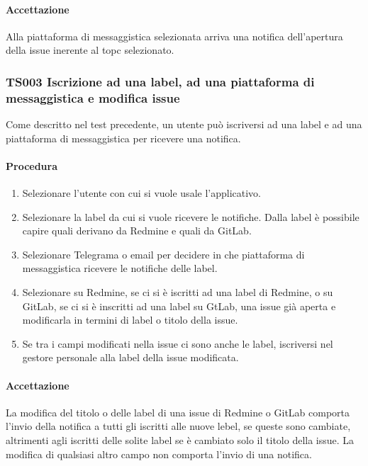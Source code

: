 		\paragraph*{Accettazione}
		Alla piattaforma di messaggistica selezionata arriva una notifica dell'apertura della issue inerente al topc selezionato.
		
	\subsubsection{TS003 Iscrizione ad una label, ad una piattaforma di messaggistica e modifica issue}
		Come descritto nel test precedente, un utente può iscriversi ad una label e ad una piattaforma di messaggistica per ricevere una notifica.
		
		\paragraph*{Procedura}
			\begin{enumerate}
				\item Selezionare l'utente con cui si vuole usale l'applicativo.
				\item Selezionare la label da cui si vuole ricevere le notifiche. Dalla label è possibile capire quali derivano da Redmine e quali da GitLab.
				\item Selezionare Telegrama o email per decidere in che piattaforma di messaggistica ricevere le notifiche delle label.
				\item Selezionare su Redmine, se ci si è iscritti ad una label di Redmine, o su GitLab, se ci si è inscritti ad una label su GtLab, una issue già aperta e modificarla in termini di label o titolo della issue.
				\item Se tra i campi modificati nella issue ci sono anche le label, iscriversi nel gestore personale alla label della issue modificata.
			\end{enumerate}
		
		\paragraph*{Accettazione}
		La modifica del titolo o delle label di una issue di Redmine o GitLab comporta l'invio della notifica a tutti gli iscritti alle nuove lebel, se queste sono cambiate, altrimenti agli iscritti delle solite label se è cambiato solo il titolo della issue. La modifica di qualsiasi altro campo non comporta l'invio di una notifica.
		
